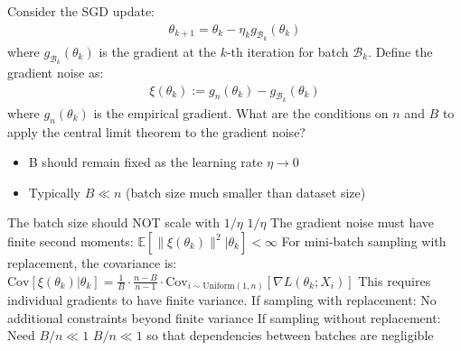\documentclass[11pt]{article}
\begin{document}
Consider the SGD update:
\begin{align}
\theta_{k+1} = \theta_k - \eta_k g_{\mathcal{B}_k}(\theta_k)
\end{align}
where $g_{\mathcal{B}_k}(\theta_k)$ is the gradient at the $k$-th iteration for batch $\mathcal{B}_k$.
Define the gradient noise as:
\begin{align}
\xi(\theta_k) := g_n(\theta_k) - g_{\mathcal{B}_k}(\theta_k)
\end{align}
where $g_n(\theta_k)$ is the empirical gradient.
What are the conditions on $n$ and $B$ to apply the central limit theorem to the gradient noise?
\begin{itemize}
    \item B should remain fixed as the learning rate $\eta \to 0$
    \item Typically $B \ll n$ (batch size much smaller than dataset size)
\end{itemize}
The batch size should NOT scale with $1/\eta$
$1/\eta$
The gradient noise must have finite second moments:
$\mathbb{E}[\|\xi(\theta_k)\|^2 | \theta_k] < \infty$
For mini-batch sampling with replacement, the covariance is:
$\text{Cov}[\xi(\theta_k) | \theta_k] = \frac{1}{B} \cdot \frac{n-B}{n-1} \cdot \text{Cov}_{i \sim \text{Uniform}(1,n)}[\nabla L(\theta_k; X_i)]$
This requires individual gradients to have finite variance.
If sampling with replacement: No additional constraints beyond finite variance
If sampling without replacement: Need $B/n \ll 1$
$B/n \ll 1$ so that dependencies between batches are negligible
\end{document}
